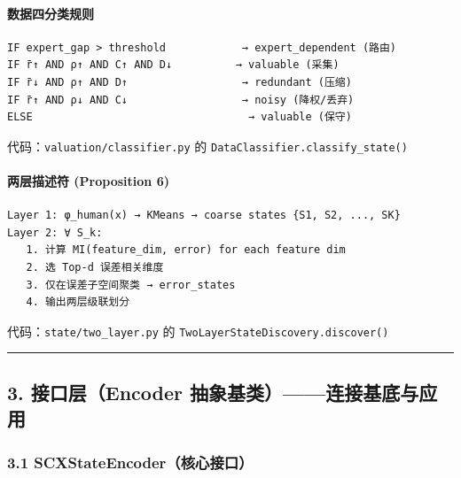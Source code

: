 \documentclass[
  12pt,
]{ctexart}
\begin{document}
\paragraph{数据四分类规则}\label{ux6570ux636eux56dbux5206ux7c7bux89c4ux5219}

\begin{verbatim}
IF expert_gap > threshold            → expert_dependent (路由)
IF r̄↑ AND ρ↑ AND C↑ AND D↓          → valuable (采集)
IF r̄↓ AND ρ↑ AND D↑                  → redundant (压缩)
IF r̄↑ AND ρ↓ AND C↓                  → noisy (降权/丢弃)
ELSE                                  → valuable (保守)
\end{verbatim}

代码：\texttt{valuation/classifier.py} 的
\texttt{DataClassifier.classify\_state()}

\paragraph{两层描述符 (Proposition
6)}\label{ux4e24ux5c42ux63cfux8ff0ux7b26-proposition-6}

\begin{verbatim}
Layer 1: φ_human(x) → KMeans → coarse states {S1, S2, ..., SK}
Layer 2: ∀ S_k:
   1. 计算 MI(feature_dim, error) for each feature dim
   2. 选 Top-d 误差相关维度
   3. 仅在误差子空间聚类 → error_states
   4. 输出两层级联划分
\end{verbatim}

代码：\texttt{state/two\_layer.py} 的
\texttt{TwoLayerStateDiscovery.discover()}

\begin{center}\rule{0.5\linewidth}{0.5pt}\end{center}

\subsection{3. 接口层（Encoder
抽象基类）------连接基底与应用}\label{ux63a5ux53e3ux5c42encoder-ux62bdux8c61ux57faux7c7bux8fdeux63a5ux57faux5e95ux4e0eux5e94ux7528}

\subsubsection{3.1
SCXStateEncoder（核心接口）}\label{scxstateencoderux6838ux5fc3ux63a5ux53e3}
\end{document}
